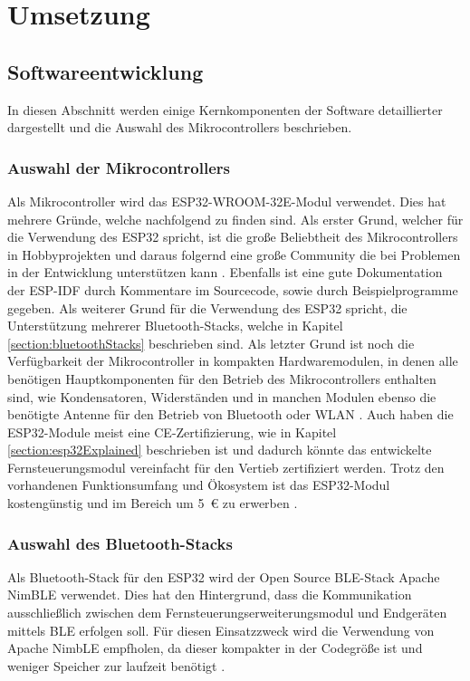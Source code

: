 
\chapter{Umsetzung}

\section{Softwareentwicklung}
In diesen Abschnitt werden einige Kernkomponenten der Software detaillierter dargestellt und die Auswahl des Mikrocontrollers beschrieben.

\subsection{Auswahl der Mikrocontrollers}
Als Mikrocontroller wird das ESP32-WROOM-32E-Modul verwendet. Dies hat mehrere Gründe, welche nachfolgend zu finden sind.
Als erster Grund, welcher für die Verwendung des ESP32 spricht, ist die große Beliebtheit des Mikrocontrollers in Hobbyprojekten und daraus folgernd eine große Community die bei Problemen in der Entwicklung unterstützen kann \cites{redditESP32}{esp32Forum}. Ebenfalls ist eine gute Dokumentation der \ac{ESP-IDF} durch Kommentare im Sourcecode, sowie durch Beispielprogramme gegeben. Als weiterer Grund für die Verwendung des ESP32 spricht, die Unterstützung mehrerer Bluetooth-Stacks, welche in Kapitel \ref{section:bluetoothStacks} beschrieben sind. Als letzter Grund ist noch die Verfügbarkeit der Mikrocontroller in kompakten Hardwaremodulen, in denen alle benötigen Hauptkomponenten für den Betrieb des Mikrocontrollers enthalten sind, wie Kondensatoren, Widerständen und in manchen Modulen ebenso die benötigte Antenne für den Betrieb von Bluetooth oder \acs{WLAN} \cite[S.~14]{espressifHardwareDesignGuidelines}. Auch haben die ESP32-Module meist eine CE-Zertifizierung, wie in Kapitel \ref{section:esp32Explained} beschrieben ist und dadurch könnte das entwickelte Fernsteuerungsmodul vereinfacht für den Vertieb zertifiziert werden. Trotz den vorhandenen Funktionsumfang und Ökosystem ist das ESP32-Modul kostengünstig und im Bereich um 5~€ zu erwerben \cite{espressifModules}.

\subsection{Auswahl des Bluetooth-Stacks}
Als Bluetooth-Stack für den ESP32 wird der Open Source \ac{BLE}-Stack Apache NimBLE verwendet. Dies hat den Hintergrund, dass die Kommunikation ausschließlich zwischen dem Fernsteuerungserweiterungsmodul und Endgeräten mittels \ac{BLE} erfolgen soll. Für diesen Einsatzzweck wird die Verwendung von Apache NimbLE empfholen, da dieser kompakter in der Codegröße ist und weniger Speicher zur laufzeit benötigt \cite{espidfBluetoothStack}.

